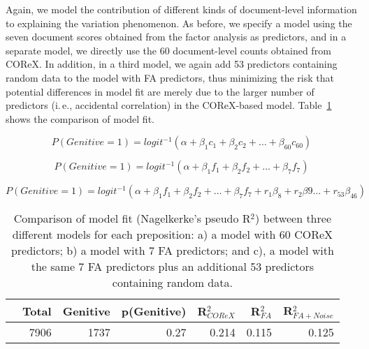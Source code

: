 Again, we model the contribution of different kinds of document-level information to explaining the variation phenomenon. As before, we specify a model using the seven document scores obtained from the factor analysis as predictors, and in a separate model, we directly use the 60 document-level counts obtained from COReX. In addition, in a third model, we again add 53 predictors containing random data to the model with FA predictors, thus minimizing the risk that potential differences in model fit are merely due to the larger number of predictors (i.\,e., accidental correlation) in the COReX-based model. Table~\ref{mn-results} shows the comparison of model fit.

 
\begin{equation}
\label{mn-glm-allpreps-corex}
  P(Genitive=1) = logit^{-1}(\alpha + \beta_1 c_1 + \beta_2 c_2 + \dots + \beta_{60} c_{60})
\end{equation}



\begin{equation}
\label{mn-glm-allpreps-fa}
  P(Genitive=1) = logit^{-1}(\alpha + \beta_1 f_1 + \beta_2 f_2 + \dots + \beta_{7} f_{7})
\end{equation}


\begin{equation}
\label{mn-glm-allpreps-fa-rr}
  P(Genitive=1) = logit^{-1}(\alpha + \beta_1 f_1 + \beta_2 f_2 + \dots + \beta_{7} f_{7} + r_1 \beta_8 + r_2 \beta9 \ldots + r_{53} \beta_{46})
\end{equation}


\begin{table}
  \begin{tabular}{lrrrrrr}
  \toprule
             & Total  & Genitive & p(Genitive) & R$^2_{COReX}$ & R$^2_{FA}$ & R$^2_{FA+Noise}$\\
  \midrule
            & 7906   & 1737   & 0.27    & 0.214   & 0.115  & 0.125\\
%  
  \bottomrule
  \end{tabular}
  \caption{Comparison of model fit (Nagelkerke's pseudo R$^2$) between three different models for each preposition: a) a model with 60 COReX predictors; b) a model with 7 FA predictors; and c), a model with the same 7 FA predictors plus an additional 53 predictors containing random data.}\label{mn-results}
\end{table}
%

